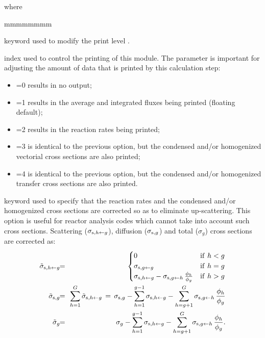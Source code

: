 \noindent where

\begin{ListeDeDescription}{mmmmmmmm}

\item[\moc{EDIT}] keyword used to modify the print level .

\item[\dusa{iprint}] index used to control the printing of this module. The
 parameter is important for adjusting the amount of data that is
printed by this calculation step:

\begin{itemize}

\item {}=0 results in no output;

\item {}=1 results in the average and integrated fluxes being printed
(floating default);

\item {}=2 results in the reaction rates being printed; 

\item {}=3 is identical to the previous option, but the condensed
and/or homogenized vectorial cross sections are also printed;

\item {}=4 is identical to the previous option, but the  condensed
and/or homogenized transfer cross sections are also printed.

\end{itemize}

\item[\moc{UPS}] keyword used to specify that the reaction rates and the condensed
and/or homogenized cross sections are corrected so as to eliminate
up-scattering. This option is useful for reactor analysis codes which cannot
take into account such cross sections. Scattering ($\sigma_{{\rm s},h\gets g}$), diffusion ($\sigma_{{\rm s},g}$)
and total ($\sigma_g$) cross sections are corrected as:
\begin{eqnarray*}
\tilde\sigma_{{\rm s},h\gets g}\negthinspace\negthinspace &=&\negthinspace\negthinspace \begin{cases} 0  & {\rm if} \ h < g\\
\sigma_{{\rm s},g\gets g} &{\rm if}  \ h = g\\
\sigma_{{\rm s},h\gets g}-\sigma_{{\rm s},g\gets h}\, {\phi_h\over \phi_g} & {\rm if}  \ h > g
\end{cases} \\
\tilde\sigma_{{\rm s},g}\negthinspace\negthinspace &=&\negthinspace\negthinspace \sum_{h=1}^G \tilde\sigma_{{\rm s},h\gets g}\, = \, \sigma_{{\rm s},g}-\sum_{h=1}^{g-1} \sigma_{{\rm s},h\gets g}-\sum_{h=g+1}^{G} \sigma_{{\rm s},g\gets h}\, {\phi_h\over \phi_g} \\
\tilde\sigma_{g}\negthinspace\negthinspace &=&\negthinspace\negthinspace \sigma_{g}-\sum_{h=1}^{g-1} \sigma_{{\rm s},h\gets g}-\sum_{h=g+1}^{G} \sigma_{{\rm s},g\gets h}\, {\phi_h\over \phi_g} .
\end{eqnarray*}


\end{ListeDeDescription}
